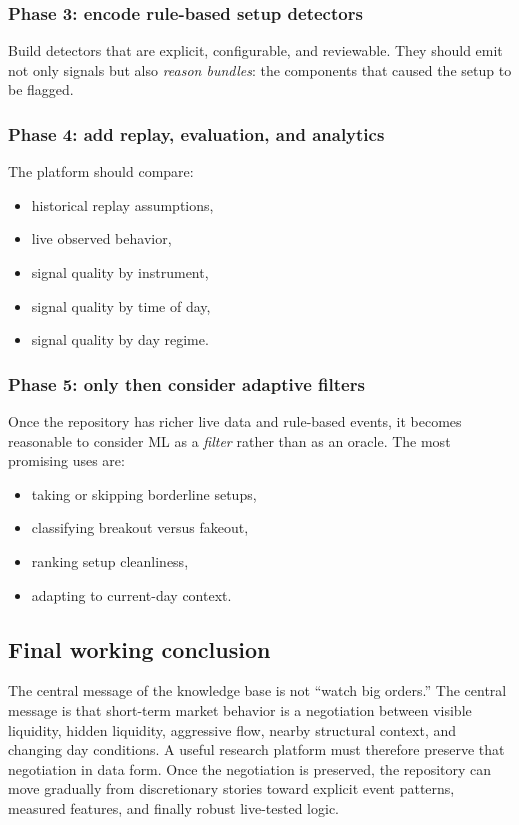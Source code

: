\subsubsection{Phase 3: encode rule-based setup detectors}

Build detectors that are explicit, configurable, and reviewable. They should emit not only
signals but also \emph{reason bundles}: the components that caused the setup to be flagged.

\subsubsection{Phase 4: add replay, evaluation, and analytics}

The platform should compare:

\begin{itemize}[leftmargin=1.4em]
  \item historical replay assumptions,
  \item live observed behavior,
  \item signal quality by instrument,
  \item signal quality by time of day,
  \item signal quality by day regime.
\end{itemize}

\subsubsection{Phase 5: only then consider adaptive filters}

Once the repository has richer live data and rule-based events, it becomes reasonable to
consider ML as a \emph{filter} rather than as an oracle. The most promising uses are:

\begin{itemize}[leftmargin=1.4em]
  \item taking or skipping borderline setups,
  \item classifying breakout versus fakeout,
  \item ranking setup cleanliness,
  \item adapting to current-day context.
\end{itemize}

\subsection{Final working conclusion}

The central message of the knowledge base is not ``watch big orders.'' The central message is
that short-term market behavior is a negotiation between visible liquidity, hidden liquidity,
aggressive flow, nearby structural context, and changing day conditions. A useful research
platform must therefore preserve that negotiation in data form. Once the negotiation is
preserved, the repository can move gradually from discretionary stories toward explicit event
patterns, measured features, and finally robust live-tested logic.
